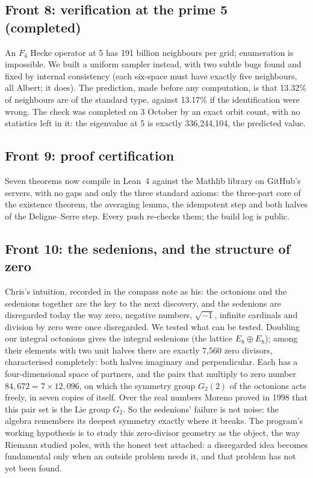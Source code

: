 \documentclass[11pt]{article}
\begin{document}
\subsection{Front 8: verification at the prime 5 (completed)}
An $F_4$ Hecke operator at 5 has 191 billion neighbours per grid; enumeration is impossible. We built a uniform sampler instead, with two subtle bugs found and fixed by internal consistency (each six-space must have exactly five neighbours, all Albert; it does). The prediction, made before any computation, is that 13.32\% of neighbours are of the standard type, against 13.17\% if the identification were wrong. The check was completed on 3 October by an exact orbit count, with no statistics left in it: the eigenvalue at 5 is exactly 336{,}244{,}104, the predicted value.

\subsection{Front 9: proof certification}
Seven theorems now compile in Lean~4 against the Mathlib library on GitHub's servers, with no gaps and only the three standard axioms: the three-part core of the existence theorem, the averaging lemma, the idempotent step and both halves of the Deligne--Serre step. Every push re-checks them; the build log is public.

\subsection{Front 10: the sedenions, and the structure of zero}
Chris's intuition, recorded in the compass note as his: the octonions and the sedenions together are the key to the next discovery, and the sedenions are disregarded today the way zero, negative numbers, $\sqrt{-1}$, infinite cardinals and division by zero were once disregarded. We tested what can be tested. Doubling our integral octonions gives the integral sedenions (the lattice $E_8\oplus E_8$); among their elements with two unit halves there are exactly 7{,}560 zero divisors, characterised completely: both halves imaginary and perpendicular. Each has a four-dimensional space of partners, and the pairs that multiply to zero number $84{,}672 = 7\times12{,}096$, on which the symmetry group $G_2(2)$ of the octonions acts freely, in seven copies of itself. Over the real numbers Moreno proved in 1998 that this pair set is the Lie group $G_2$. So the sedenions' failure is not noise: the algebra remembers its deepest symmetry exactly where it breaks. The program's working hypothesis is to study this zero-divisor geometry as the object, the way Riemann studied poles, with the honest test attached: a disregarded idea becomes fundamental only when an outside problem needs it, and that problem has not yet been found.
\end{document}
